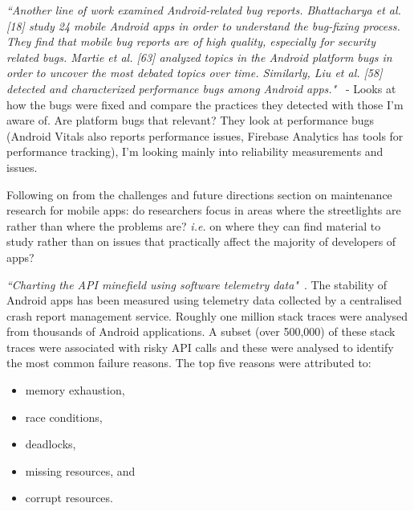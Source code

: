 \emph{``Another line of work examined Android-related bug reports. Bhattacharya et al. [18] study 24 mobile Android apps in order to understand the bug-fixing process. They find that mobile bug reports are of high quality, especially for security related bugs. Martie et al. [63] analyzed topics in the Android platform bugs in order to uncover the most debated topics over time. Similarly, Liu et al. [58] detected and characterized performance bugs among Android apps."}~\cite[p. 27]{nagappan2016_future_trends_in_sw_eng_for_mobile_apps} - Looks at how the bugs were fixed and compare the practices they detected with those I'm aware of. Are platform bugs that relevant? They look at performance bugs (Android Vitals also reports performance issues, Firebase Analytics has tools for performance tracking), I'm looking mainly into reliability measurements and issues.

Following on from the challenges and future directions section on maintenance research for mobile apps: do researchers focus in areas where the streetlights are rather than where the problems are? \emph{i.e.} on where they can find material to study rather than on issues that practically affect the majority of developers of apps?

\emph{``Charting the API minefield using software telemetry data"}~\cite{Kechagia2015_charting_API_minefield_using_telemetry_data}. The stability of Android apps has been measured using telemetry data collected by a centralised crash report management service. Roughly one million stack traces were analysed from thousands of Android applications. A subset (over 500,000) of these stack traces were associated with risky API calls and these were analysed to identify the most common failure reasons. The top five reasons were attributed to:
    \begin{itemize}
        \item memory exhaustion,
        \item race conditions,
        \item deadlocks,
        \item missing resources, and
        \item corrupt resources.
    \end{itemize}
    
